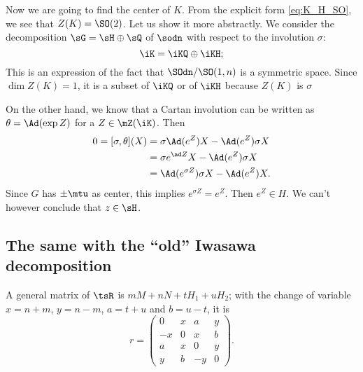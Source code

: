 Now we are going to find the center of $K$. From the explicit form \eqref{eq:K_H_SO}, we see that $Z(K)=\SO(2)$. Let us show it more abstractly. We consider the decomposition $\sG=\sH\oplus\sQ$ of $\sodn$ with respect to the involution $\sigma$:
\[
	\iK=\iKQ\oplus\iKH;
\]
This is an expression of the fact that $\SOdn/\SO(1,n)$ is a symmetric space. Since $\dim Z(K)=1$, it is a subset of $\iKQ$ or of $\iKH$ because $Z(K)$ is $\sigma$

On the other hand, we know that a Cartan involution can be written as $\theta=\Ad(\exp Z)$ for a $Z\in \mZ(\iK)$. Then
\begin{equation}
	\begin{split}
		0=[\sigma,\theta](X) & =\sigma\Ad(e^Z)X-\Ad(e^Z)\sigma X     \\
		                     & =\sigma e^{\ad Z}X-\Ad(e^Z)\sigma X   \\
		                     & =\Ad(e^{\sigma Z})\sigma X-\Ad(e^Z)X.
	\end{split}
\end{equation}
Since $G$ has $\pm\mtu$ as center, this implies $e^{\sigma Z}=e^Z$. Then $e^Z\in H$. We can't however conclude that $z\in\sH$.

\subsection{The same with the ``old'' Iwasawa decomposition}

A general matrix of $\tsR$ is $mM+nN+tH_1+uH_2$; with the change of variable $x=n+m$, $y=n-m$, $a=t+u$ and $b=u-t$, it is
\begin{equation}
	r=
	\begin{pmatrix}
		0  & x & a  & y \\
		-x & 0 & x  & b \\
		a  & x & 0  & y \\
		y  & b & -y & 0
	\end{pmatrix}.
\end{equation}

